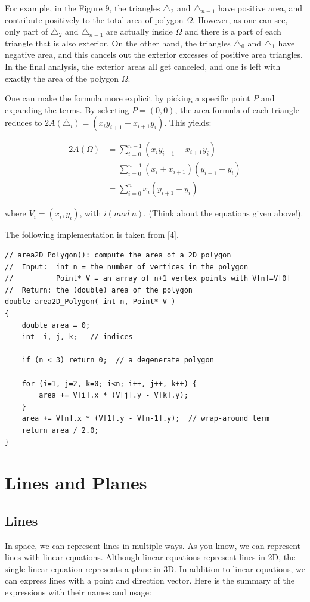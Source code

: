\documentclass[12pt]{article}
\begin{document}
For example, in the Figure 9, the triangles $\triangle_2$ and $\triangle_{n-1}$ have 
positive area, and contribute positively to the total area of polygon $\Omega$. 
However, as one can see, only part of $\triangle_2$ and $\triangle_{n-1}$ are actually inside 
$\Omega$ and there is a part of each triangle that is also exterior. 
On the other hand, the triangles $\triangle_0$ and $\triangle_1$ have negative area, and 
this cancels out the exterior excesses of positive area triangles. 
In the final analysis, the exterior areas all get canceled, and one is left with 
exactly the area of the polygon $\Omega$.

One can make the formula more explicit by picking a specific point $P$ and 
expanding the terms. By selecting $P=(0,0)$, the area formula of each triangle 
reduces to $2A(\triangle_i)=(x_iy_{i+1}-x_{i+1}y_i)$. This yields:

\begin{align*}
  2A(\Omega) &= \sum_{i=0}^{n-1} (x_iy_{i+1} - x_{i+1}y_i) \\
  &= \sum_{i=0}^{n-1} (x_i + x_{i+1})(y_{i+1} - y_i) \\
  &= \sum_{i=0}^{n} x_i(y_{i+1} - y_i)
\end{align*}

where $V_i = (x_i, y_i)$, with $i(mod\ n)$. (Think about the equations given above!).

The following implementation is taken from [4].
\begin{lstlisting}
// area2D_Polygon(): compute the area of a 2D polygon
//  Input:  int n = the number of vertices in the polygon
//          Point* V = an array of n+1 vertex points with V[n]=V[0]
//  Return: the (double) area of the polygon
double area2D_Polygon( int n, Point* V )
{
    double area = 0;
    int  i, j, k;   // indices

    if (n < 3) return 0;  // a degenerate polygon

    for (i=1, j=2, k=0; i<n; i++, j++, k++) {
        area += V[i].x * (V[j].y - V[k].y);
    }
    area += V[n].x * (V[1].y - V[n-1].y);  // wrap-around term
    return area / 2.0;
}
\end{lstlisting}

\section{Lines and Planes}
\subsection{Lines}
In space, we can represent lines in multiple ways. As you know, we can represent lines with linear equations. Although linear equations represent lines in 2D, the single linear equation represents a plane in 3D. In addition to linear equations, we can express lines with a point and direction vector.
Here is the summary of the expressions with their names and usage:
\end{document}

